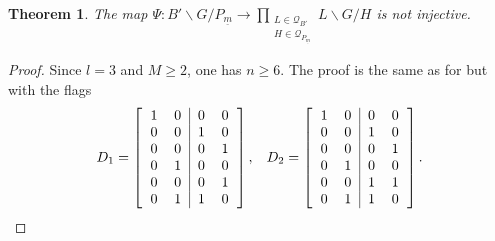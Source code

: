 \documentclass[pdftex]{sigma}
\numberwithin{equation}{section}
\newtheorem{Theorem}{Theorem}[section]
\theoremstyle{definition}
\theoremstyle{plain}
\theoremstyle{plain}
\theoremstyle{plain}
\theoremstyle{plain}
\begin{document}
\begin{Theorem}
	The map $\Psi : B'\backslash G/P_{\underline m} \to \displaystyle \prod_{\substack{L \in \mathcal Q_{B'} \\ H \in \mathcal Q_{P_{\underline m}}}} L\backslash G/H$ is not injective.
\end{Theorem}
\begin{proof}
	Since $l = 3$ and $M \geqslant 2$, one has $n \geqslant 6$.
	The proof is the same as for  but with the flags
	\begin{equation*}
		D_1 = \left[\begin{tabular}{cc|cc}
	1 & 0 & 0 & 0 \\
	0 & 0 & 1 & 0 \\
	0 & 0 & 0 & 1 \\
	0 & 1 & 0 & 0 \\
	0 & 0 & 0 & 1 \\
	0 & 1 & 1 & 0 
\end{tabular}\right], \hspace{3mm} D_2 = \left[\begin{tabular}{cc|cc}
	1 & 0 & 0 & 0 \\
	0 & 0 & 1 & 0 \\
	0 & 0 & 0 & 1 \\
	0 & 1 & 0 & 0 \\
	0 & 0 & 1 & 1 \\
	0 & 1 & 1 & 0 
\end{tabular}\right].
	\end{equation*}
\end{proof}
\end{document}
